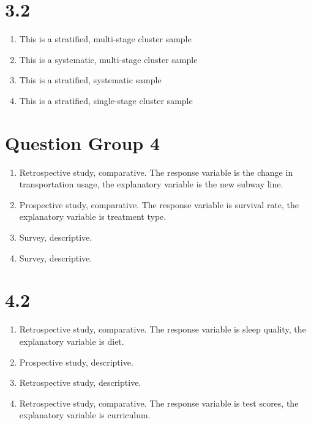\documentclass{article}
\begin{document}
\section*{3.2}
\begin{enumerate}
\item This is a stratified, multi-stage cluster sample \\
\item This is a systematic, multi-stage cluster sample \\
\item This is a stratified, systematic sample \\
\item This is a stratified, single-stage cluster sample \\
\end{enumerate}
\section*{Question Group 4}
\begin{enumerate}
\item Retrospective study, comparative. The response variable is the change in transportation usage, the explanatory variable is the new subway line. \\
\item Prospective study, comparative. The response variable is survival rate, the explanatory variable is treatment type. \\
\item Survey, descriptive. \\
\item Survey, descriptive. \\
\end{enumerate}
\section*{4.2}
\begin{enumerate}
\item Retrospective study, comparative. The response variable is sleep quality, the explanatory variable is diet. \\
\item Prospective study, descriptive. 
\item Retrospective study, descriptive. \\
\item Retrospective study, comparative. The response variable is test scores, the explanatory variable is curriculum. \\
\end{enumerate}
\end{document}
